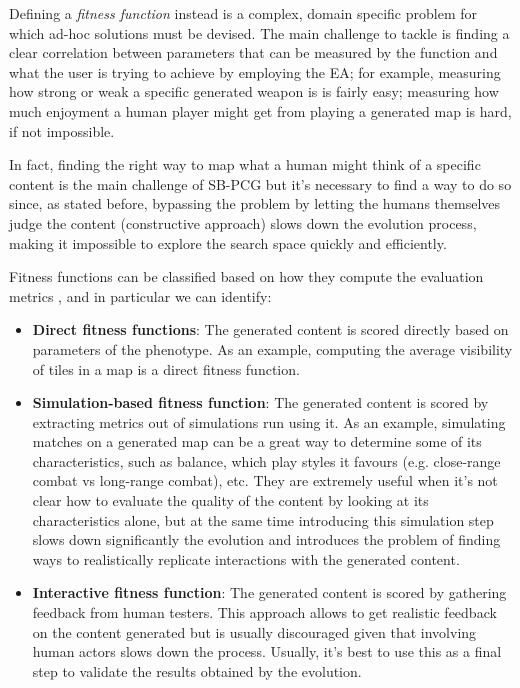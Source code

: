 Defining a \textit{fitness function} instead is a complex, domain specific problem for which ad-hoc solutions must be devised. The main challenge to tackle is finding a clear correlation between parameters that can be measured by the function and what the user is trying to achieve by employing the EA; for example, measuring how strong or weak a specific generated weapon is is fairly easy; measuring how much enjoyment a human player might get from playing a generated map is hard, if not impossible. 

In fact, finding the right way to map what a human might think of a specific content is the main challenge of SB-PCG but it’s necessary to find a way to do so since, as stated before, bypassing the problem by letting the humans themselves judge the content (constructive approach) slows down the evolution process, making it impossible to explore the search space quickly and efficiently.

Fitness functions can be classified based on how they compute the evaluation metrics \cite{sbpcg_taxonomy}, and in particular we can identify:

\begin{itemize}
\item \textbf{Direct fitness functions}: The generated content is scored directly based on parameters of the phenotype. As an example, computing the average visibility of tiles in a map is a direct fitness function.
\item \textbf{Simulation-based fitness function}: The generated content is scored by extracting metrics out of simulations run using it. As an example, simulating matches on a generated map can be a great way to determine some of its characteristics, such as balance, which play styles it favours (e.g. close-range combat vs long-range combat), etc. They are extremely useful when it’s not clear how to evaluate the quality of the content by looking at its characteristics alone, but at the same time introducing this simulation step slows down significantly the evolution and introduces the problem of finding ways to realistically replicate interactions with the generated content. 
\item \textbf{Interactive fitness function}: The generated content is scored by gathering feedback from human testers. This approach allows to get realistic feedback on the content generated but is usually discouraged given that involving human actors slows down the process. Usually, it’s best to use this as a final step to validate the results obtained by the evolution.
\end{itemize}

